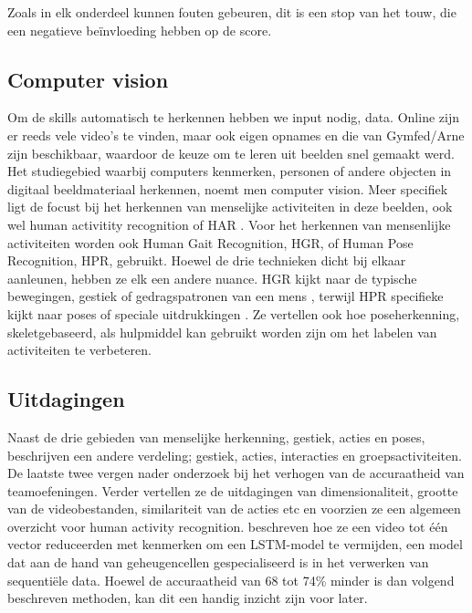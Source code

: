Zoals in elk onderdeel kunnen fouten gebeuren, dit is een stop van het touw, die een negatieve beïnvloeding hebben op de score.

\subsection{Computer vision}
\label{subsec:computer vision}

Om de skills automatisch te herkennen hebben we input nodig, data. Online zijn er reeds vele video's te vinden, maar ook eigen opnames en die van Gymfed/Arne zijn beschikbaar, waardoor de keuze om te leren uit beelden snel gemaakt werd. Het studiegebied waarbij computers kenmerken, personen of andere objecten in digitaal beeldmateriaal herkennen, noemt men computer vision. Meer specifiek ligt de focust bij het herkennen van menselijke activiteiten in deze beelden, ook wel human activitity recognition of HAR \autocite{Pareek_2020}.
Voor het herkennen van mensenlijke activiteiten worden ook Human Gait Recognition, HGR, of Human Pose Recognition, HPR, gebruikt. Hoewel de drie technieken dicht bij elkaar aanleunen, hebben ze elk een andere nuance. HGR kijkt naar de typische bewegingen, gestiek of gedragspatronen van een mens \autocite{Alharthi_2019}, terwijl HPR specifieke kijkt naar poses of speciale uitdrukkingen \autocite{Song_2021}. Ze vertellen ook hoe poseherkenning, skeletgebaseerd, als hulpmiddel kan gebruikt worden zijn om het labelen van activiteiten te verbeteren.


\subsection{Uitdagingen}
\label{subsec:uitdagingen}

Naast de drie gebieden van menselijke herkenning, gestiek, acties en poses, beschrijven \textcite{Pareek_2020} een andere verdeling; gestiek, acties, interacties en groepsactiviteiten. De laatste twee vergen nader onderzoek bij het verhogen van de accuraatheid van teamoefeningen. Verder vertellen ze de uitdagingen van dimensionaliteit, grootte van de videobestanden, similariteit van de acties etc en voorzien ze een algemeen overzicht voor human activity recognition. \textcite{Issa_2023} beschreven hoe ze een video tot één vector reduceerden met kenmerken om een LSTM-model te vermijden, een model dat aan de hand van geheugencellen gespecialiseerd is in het verwerken van sequentiële data. Hoewel de accuraatheid van 68 tot 74\% minder is dan volgend beschreven methoden, kan dit een handig inzicht zijn voor later.


